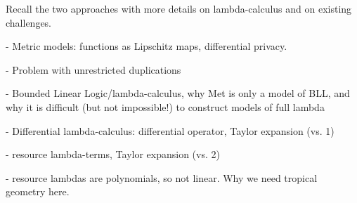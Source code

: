 Recall the two approaches with more details on lambda-calculus and on existing challenges.

- Metric models: functions as Lipschitz maps, differential privacy.

- Problem with unrestricted duplications

- Bounded Linear Logic/lambda-calculus, why Met is only a model of BLL, and why it is difficult (but not impossible!) to construct models of full lambda


- Differential lambda-calculus: differential operator, Taylor expansion (vs. 1)

- resource lambda-terms, Taylor expansion (vs. 2)

- resource lambdas are polynomials, so not linear. Why we need tropical geometry here.





